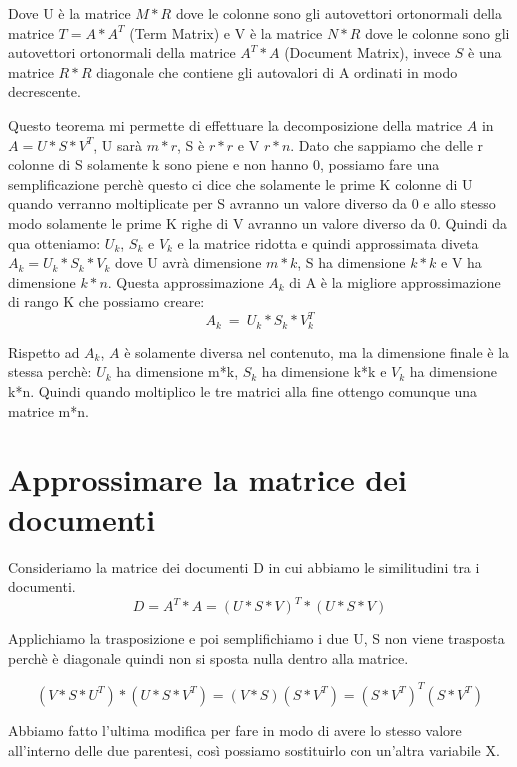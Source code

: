 \documentclass[14pt]{extreport}
\begin{document}
Dove U è la matrice $M*R$ dove le colonne sono gli autovettori ortonormali della matrice $T=A*A^T$ (Term Matrix) e V è la matrice $N*R$ dove le colonne sono gli autovettori ortonormali della matrice $A^T*A$ (Document Matrix), invece $S$ è una matrice $R*R$ diagonale che contiene gli autovalori di A ordinati in modo decrescente.

Questo teorema mi permette di effettuare la decomposizione della matrice $A$ in $A=U*S*V^T$, U sarà $m*r$, S è $r*r$ e V $r*n$.
Dato che sappiamo che delle r colonne di S solamente k sono piene e non hanno 0, possiamo fare una semplificazione perchè questo ci dice che solamente le prime K colonne di U quando verranno moltiplicate per S avranno un valore diverso da 0 e allo stesso modo solamente le prime K righe di V avranno un valore diverso da 0.
Quindi da qua otteniamo: $U_k$, $S_k$ e $V_k$ e la matrice ridotta e quindi approssimata diveta $A_k = U_k * S_k * V_k$ dove U avrà dimensione $m*k$, S ha dimensione $k*k$ e V ha dimensione $k*n$.
Questa approssimazione $A_k$ di A è la migliore approssimazione di rango K che possiamo creare:
\newline
\begin{equation}
    A_k\ =\ U_k * S_k * V_k^T 
\end{equation}

Rispetto ad $A_k$, $A$ è solamente diversa nel contenuto, ma la dimensione finale è la stessa perchè:
$U_k$ ha dimensione m*k, $S_k$ ha dimensione k*k e $V_k$ ha dimensione k*n. Quindi quando moltiplico le tre matrici alla fine ottengo comunque una matrice m*n.

\section{Approssimare la matrice dei documenti}

Consideriamo la matrice dei documenti D in cui abbiamo le similitudini tra i documenti.
\begin{equation}
    D = A^T*A = (U*S*V)^T*(U*S*V)
\end{equation}

Applichiamo la trasposizione e poi semplifichiamo i due U, S non viene trasposta perchè è diagonale quindi non si sposta nulla dentro alla matrice.

\begin{equation}
    (V*S*U^T)*(U*S*V^T) = (V*S)(S*V^T) = (S*V^T)^T(S*V^T)
\end{equation}

Abbiamo fatto l'ultima modifica per fare in modo di avere lo stesso valore all'interno delle due parentesi, così possiamo sostituirlo con un'altra variabile X.
\end{document}
